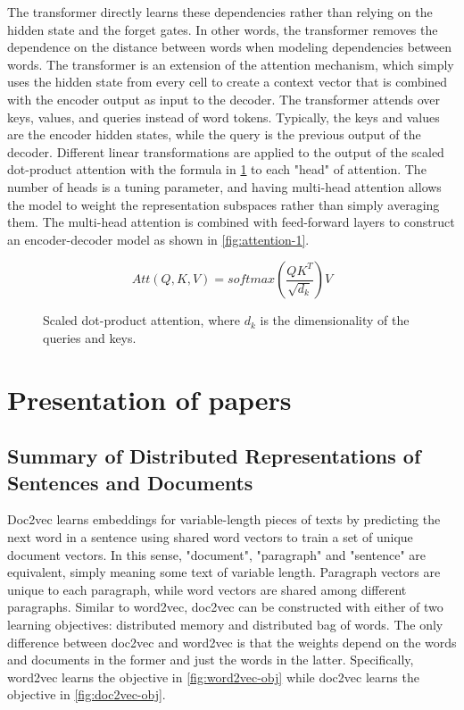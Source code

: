 The transformer \cite{attention} directly learns these dependencies rather than relying on the hidden state and the forget gates. In other words, the transformer removes the dependence on the distance between words when modeling dependencies between words. The transformer is an extension of the attention mechanism, which simply uses the hidden state from every cell to create a context vector that is combined with the encoder output as input to the decoder. The transformer attends over keys, values, and queries instead of word tokens. Typically, the keys and values are the encoder hidden states, while the query is the previous output of the decoder. Different linear transformations are applied to the output of the scaled dot-product attention with the formula in \ref{fig:attention-formula} to each "head" of attention. The number of heads is a tuning parameter, and having multi-head attention allows the model to weight the representation subspaces rather than simply averaging them. The multi-head attention is combined with feed-forward layers to construct an encoder-decoder model as shown in \ref{fig:attention-1}.

\begin{figure}
    \centering
    $$Att(Q,K,V) = softmax(\frac{QK^T}{\sqrt{d_k}})V$$
    \caption{Scaled dot-product attention, where $d_k$ is the dimensionality of the queries and keys.}
    \label{fig:attention-formula}
\end{figure}


\section{\label{sec:level4} Presentation of papers}
\subsection{Summary of Distributed Representations of Sentences and Documents}
Doc2vec \cite{conf/icml/LeM14} learns embeddings for variable-length pieces of texts by predicting the next word in a sentence using shared word vectors to train a set of unique document vectors.  In this sense, "document", "paragraph" and "sentence" are equivalent, simply meaning some text of variable length. Paragraph vectors are unique to each paragraph, while word vectors are shared among different paragraphs. Similar to word2vec, doc2vec can be constructed with either of two learning objectives: distributed memory and distributed bag of words. The only difference between doc2vec and word2vec is that the weights depend on the words and documents in the former and just the words in the latter. Specifically, word2vec learns the objective in \ref{fig:word2vec-obj} while doc2vec learns the objective in \ref{fig:doc2vec-obj}.

